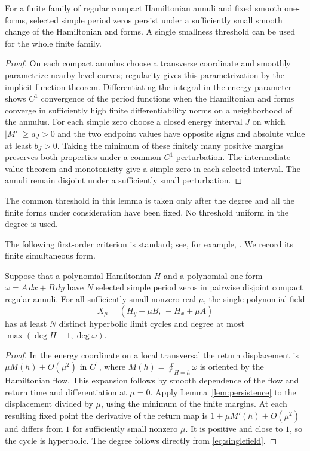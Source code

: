 \begin{lemma}\label{lem:persistence}
For a finite family of regular compact Hamiltonian annuli and fixed
smooth one-forms, selected simple period zeros persist under a sufficiently
small smooth change of the Hamiltonian and forms. A single smallness
threshold can be used for the whole finite family.
\end{lemma}
\begin{proof}
On each compact annulus choose a transverse coordinate and smoothly
parametrize nearby level curves; regularity gives this parametrization
by the implicit function theorem. Differentiating the integral in the
energy parameter shows $C^1$ convergence of the period functions when
the Hamiltonian and forms converge in sufficiently high finite
differentiability norms on a neighborhood of the annulus.
For each simple zero choose a closed energy interval $J$ on which
$|M'|\ge a_J>0$ and the two endpoint values have opposite signs and
absolute value at least $b_J>0$. Taking the minimum of these finitely
many positive margins preserves both properties under a common
$C^1$ perturbation. The intermediate value theorem and monotonicity
give a simple zero in each selected interval. The annuli remain disjoint
under a sufficiently small perturbation.
\end{proof}

The common threshold in this lemma is taken only after the degree and
all the finite forms under consideration have been fixed. No threshold
uniform in the degree is used.

The following first-order criterion is standard; see, for example,
\cite[p.~443]{LiLiLlibreZhang2001}. We record its finite simultaneous form.

\begin{lemma}\label{lem:melnikov}
Suppose that a polynomial Hamiltonian $H$ and a polynomial one-form
$\omega=A\,dx+B\,dy$ have $N$ selected simple period zeros in pairwise
disjoint compact regular annuli. For all sufficiently small nonzero real
$\mu$, the single polynomial field
\begin{equation}\label{eq:singlefield}
 X_\mu=(H_y-\mu B,\,-H_x+\mu A)
\end{equation}
has at least $N$ distinct hyperbolic limit cycles and degree at most
$\max(\deg H-1,\deg\omega)$.
\end{lemma}
\begin{proof}
In the energy coordinate on a local transversal the return displacement
is $\mu M(h)+O(\mu^2)$ in $C^1$, where
$M(h)=\oint_{H=h}\omega$ is oriented by the Hamiltonian flow.
This expansion follows by smooth dependence of the flow and return time
and differentiation at $\mu=0$. Apply Lemma~\ref{lem:persistence} to the
displacement divided by $\mu$, using the minimum of the finite margins.
At each resulting fixed point the derivative of the return map is
$1+\mu M'(h)+O(\mu^2)$ and differs from $1$ for sufficiently small
nonzero $\mu$. It is positive and close to $1$, so the cycle is
hyperbolic. The degree follows directly from \eqref{eq:singlefield}.
\end{proof}
